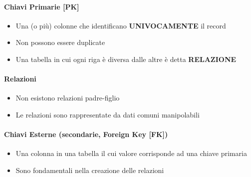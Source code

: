 \documentclass[12pt,a4paper]{article}
\begin{document}
\paragraph{Chiavi Primarie [PK]\\}
\begin{itemize}
\item Una (o più) colonne che identificano \textbf{UNIVOCAMENTE} il record
\item Non possono essere duplicate
\item Una tabella in cui ogni riga è diversa dalle altre è detta \textbf{RELAZIONE}
\end{itemize}

\paragraph{Relazioni\\}
\begin{itemize}
\item Non esistono relazioni padre-figlio
\item Le relazioni sono rappresentate da dati comuni manipolabili
\end{itemize}

\paragraph{Chiavi Esterne (secondarie, Foreign Key [FK])\\}
\begin{itemize}
\item Una colonna in una tabella il cui valore corrisponde ad una chiave primaria
\item Sono fondamentali nella creazione delle relazioni
\end{itemize}
\end{document}
